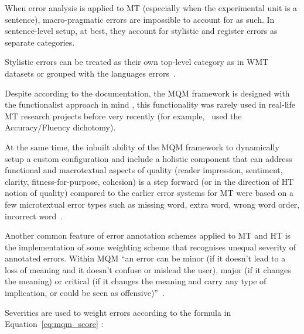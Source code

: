 When error analysis is applied to MT (especially when the experimental unit is a sentence), macro-pragmatic errors are impossible to account for as such. In sentence-level setup, at best, they account for stylistic and register errors as separate categories. 

Stylistic errors can be treated as their own top-level category as in WMT datasets or grouped with the languages errors~\cite[see]{Zaretskaya2016}. 

Despite according to the documentation, the MQM framework is designed with the functionalist approach in mind %
, this functionality was rarely used in real-life MT research projects before very recently (for example,~\citet{SanchezTorron2016} used the Accuracy/Fluency dichotomy). 

At the same time, the inbuilt ability of the MQM framework to dynamically setup a custom configuration and include a holistic component that can address functional and macrotextual aspects of quality (reader impression, sentiment, clarity, fitness-for-purpose, cohesion) is a step forward (or in the direction of HT notion of quality) compared to the earlier error systems for MT were based on a few microtextual error types such as missing word, extra word, wrong word order, incorrect word~\cite{Llitjos2005, Vilar2006}. 

Another common feature of error annotation schemes applied to MT and HT is the implementation of some weighting scheme that recognises unequal severity of annotated errors. Within MQM ``an error can be minor (if it doesn't lead to a loss of meaning and it doesn't confuse or mislead the user), major (if it changes the meaning) or critical (if it changes the meaning and carry any type of implication, or could be seen as offensive)''~\cite{Dugast2016}. 

Severities are used to weight errors according to the formula in Equation~\ref{eq:mqm_score} \cite[from][p.745, who refered to \citet{SanchezTorron2016}]{Specia2020wmt}:


